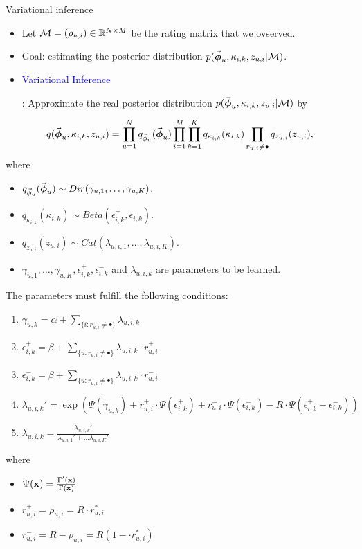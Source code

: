 \documentclass{beamer}
\begin{document}
\begin{frame}{Variational inference}
    \begin{itemize}
        \item Let $\mathcal{M} = (\rho_{u, i}) \in \mathbb R^{N \times M}$ be the rating matrix that we ovserved.
        \item Goal: estimating the posterior distribution $ p(\vec{\mbox{\boldmath{$\phi$}}}_{u}, \kappa_{i, k}, z_{u, i} | \mathcal{M}) $.
        \item \textcolor{blue}{Variational Inference}
        
        : Approximate the real posterior distribution $ p(\vec{\mbox{\boldmath{$\phi$}}}_{u}, \kappa_{i, k}, z_{u, i} | \mathcal{M}) $ by
    \end{itemize}
   	\[
	q(\vec{\mbox{\boldmath{$\phi$}}}_{u}, \kappa_{i, k}, z_{u, i}) =
	\prod_{u=1}^{N} q_{\vec{\phi}_u}(\vec{\mbox{\boldmath{$\phi$}}}_u) 
	\prod_{i=1}^M \prod_{k=1}^K  q_{\kappa_{i, k}}(\kappa_{i, k}) 
	\prod_{r_{u, i} \neq \bullet} q_{z_{u, i}}(z_{u, i}),  	
	\]
	where
	\begin{itemize}
	\item $ q_{\vec{\phi}_u}(\vec{\mbox{\boldmath{$\phi$}}}_u) \sim Dir(\gamma_{u, 1}, \dots, \gamma_{u, K}) $.
	\item $ q_{\kappa_{i, k}}(\kappa_{i, k}) \sim Beta(\epsilon^+_{i, k}, \epsilon^-_{i, k}) $.
	\item $ q_{z_{u, i}}(z_{u, i}) \sim Cat(\lambda_{u, i, 1}, \dots, \lambda_{u, i, K}) $.
	\item $ \gamma_{u, 1}, \dots, \gamma_{u, K}, \epsilon^+_{i, k}, \epsilon^-_{i, k}$ and $ \lambda_{u, i, k} $ are parameters to be learned.
	\end{itemize}
\end{frame}

\begin{frame}
The parameters must fulfill the following conditions:
	\begin{enumerate}
		\item $ \gamma_{u, k} = \alpha + \sum_{\{i: r_{u, i} \neq \bullet\}} \lambda_{u, i, k} $
		\item $ \epsilon_{i, k}^+ = \beta +  \sum_{\{u: r_{u, i} \neq \bullet\}} \lambda_{u, i, k} \cdot r_{u, i}^+ $
		\item $ \epsilon_{i, k}^- = \beta +  \sum_{\{u: r_{u, i} \neq \bullet\}} \lambda_{u, i, k} \cdot r_{u, i}^- $
		\item $ \lambda_{u, i, k}' = \exp(
		\Psi(\gamma_{u, k}) + r_{u, i}^+ \cdot \Psi(\epsilon_{i, k}^+)
		+ r_{u, i}^- \cdot \Psi(\epsilon_{i, k}^-) - R \cdot \Psi(\epsilon_{i, k}^+ + \epsilon_{i, k}^-) )  $
		\item $ \lambda_{u, i, k} = \frac{\lambda_{u, i, k}'}{\lambda_{u, i, 1}' + \dots \lambda_{u, i, K}'}  $
	\end{enumerate}
 where
	\begin{itemize}
		\item $\Psi(\mathbf x) = \frac{\Gamma'(\mathbf x)}{\Gamma(\mathbf x)}$
		\item $ r_{u, i}^+ = \rho_{u, i} = R \cdot r^*_{u, i} $ 
		\item $ r_{u, i}^- = R - \rho_{u, i} = R(1 - \cdot r^*_{u, i})  $
	\end{itemize}
\end{frame}
\end{document}
